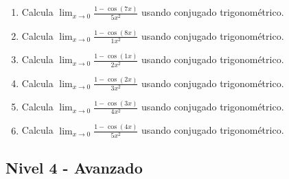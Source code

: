 \documentclass[11pt,a4paper]{article}
\begin{document}
\begin{enumerate}[label=\textbf{E\arabic*.},start=541]
\item Calcula $\displaystyle\lim_{x\to0}\frac{1-\cos(7x)}{5x^2}$ usando conjugado trigonométrico.

\item Calcula $\displaystyle\lim_{x\to0}\frac{1-\cos(8x)}{1x^2}$ usando conjugado trigonométrico.

\item Calcula $\displaystyle\lim_{x\to0}\frac{1-\cos(1x)}{2x^2}$ usando conjugado trigonométrico.

\item Calcula $\displaystyle\lim_{x\to0}\frac{1-\cos(2x)}{3x^2}$ usando conjugado trigonométrico.

\item Calcula $\displaystyle\lim_{x\to0}\frac{1-\cos(3x)}{4x^2}$ usando conjugado trigonométrico.

\item Calcula $\displaystyle\lim_{x\to0}\frac{1-\cos(4x)}{5x^2}$ usando conjugado trigonométrico.

\end{enumerate}

\subsection{Nivel 4 - Avanzado}
\end{document}
